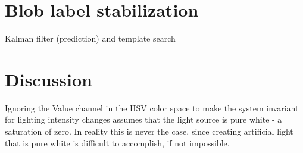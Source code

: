 \section{Blob label stabilization}
Kalman filter (prediction) and template search

\section{Discussion}
Ignoring the Value channel in the HSV color space to make the system invariant for lighting intensity changes assumes that the light source is pure white - a saturation of zero. In reality this is never the case, since creating artificial light that is pure white is difficult to accomplish, if not impossible.


\begin{figure}[htbp]
\begin{center}
\hspace{0.03\linewidth}
\hspace{0.03\linewidth}
\hspace{0.03\linewidth}

\end{center}
\end{figure}
